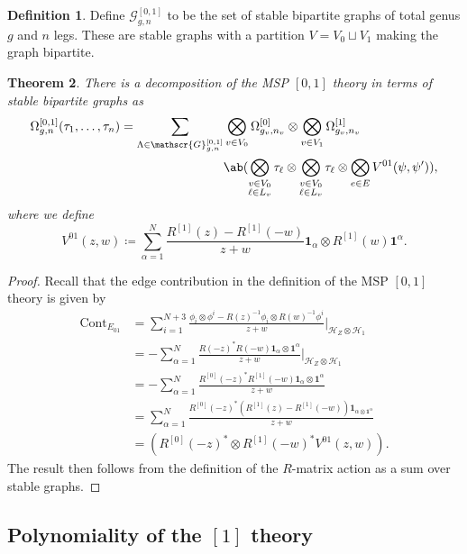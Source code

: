 \documentclass[10pt]{amsart}
\newtheorem{thm}{Theorem}[section]
\theoremstyle{definition}
\newtheorem{defn}[thm]{Definition}
\theoremstyle{remark}
\theoremstyle{plain}
\theoremstyle{definition}
\theoremstyle{remark}
\newcommand{\msc}[1]{\mathscr{#1}}
\newcommand{\on}[1]{\operatorname{#1}}
\newcommand{\1}{\mathbf{1}}
\newcommand{\2}{\mathbf{2}}
\newcommand{\3}{\mathbf{3}}
\numberwithin{equation}{section}
\begin{document}
\begin{defn}
    Define $\msc{G}^{[0,1]}_{g,n}$ to be the set of stable bipartite graphs of total genus $g$ and $n$ legs. These are stable graphs with a partition $V = V_0 \sqcup V_1$ making the graph bipartite.
\end{defn}


\begin{thm}\label{thm:01bipartite}
    There is a decomposition of the MSP $[0,1]$ theory in terms of stable bipartite graphs as
    \begin{align*}
        \Omega^{[0,1]}_{g,n}(\tau_1, \ldots, \tau_n) = \sum_{\Lambda \in \msc{G}_{g,n}^{[0,1]}} & \bigotimes_{v \in V_0} \Omega^{[0]}_{g_v, n_v} \otimes \bigotimes_{v \in V_1} \Omega^{[1]}_{g_v, n_v} \\
        &\ab(\bigotimes_{\substack{v \in V_0 \\ \ell \in L_v}} \tau_{\ell} \otimes \bigotimes_{\substack{v \in V_0 \\ \ell \in L_v}} \tau_{\ell} \otimes \bigotimes_{e \in E} V^{01}(\psi,\psi')),
    \end{align*}
    where we define
    \[V^{01}(z,w) \coloneqq \sum_{\alpha=1}^N \frac{R^{[1]}(z) - R^{[1]}(-w)}{z+w} \1_{\alpha} \otimes R^{[1]}(w) \1^{\alpha}. \]
\end{thm}

\begin{proof}
    Recall that the edge contribution in the definition of the MSP $[0,1]$ theory is given by
    \begin{align*}
        \on{Cont}_{E_{01}} &= \sum_{i=1}^{N+3} \frac{\phi_i \otimes \phi^i - R(z)^{-1} \phi_i \otimes R(w)^{-1}\phi^i}{z+w} \Bigg\vert_{\msc{H}_Z \otimes \msc{H}_1} \\
        &= - \sum_{\alpha=1}^N \frac{R(-z)^* R(-w) \1_{\alpha} \otimes \1^{\alpha}}{z+w} \Bigg\vert_{\msc{H}_Z \otimes \msc{H}_1} \\
        &= - \sum_{\alpha=1}^N \frac{R^{[0]}(-z)^* R^{[1]}(-w) \1_{\alpha} \otimes \1^{\alpha}}{z+w} \\ 
        &= \sum_{\alpha=1}^N \frac{R^{[0]}(-z)^* (R^{[1]}(z) - R^{[1]}(-w))\1_{\alpha \otimes \1^{\alpha}}}{z+w} \\
        &= (R^{[0]}(-z)^* \otimes R^{[1]}(-w)^* V^{01}(z,w)).
    \end{align*}
    The result then follows from the definition of the $R$-matrix action as a sum over stable graphs.
\end{proof}


\subsection{Polynomiality of the $[1]$ theory}%
\label{sub:Polynomiality of the 1 theory}
\end{document}
